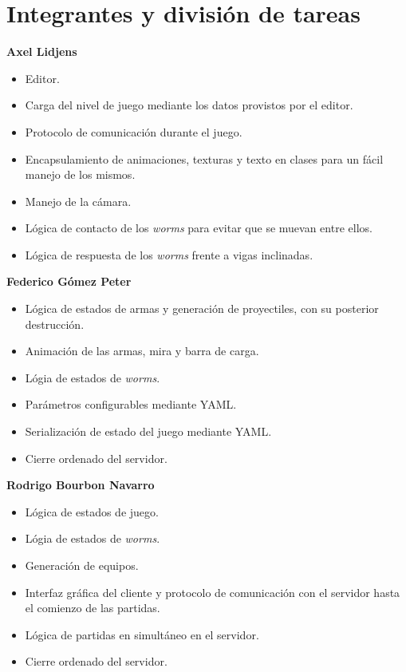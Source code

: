 \documentclass{article}
\begin{document}
\pagestyle{fancy}
\renewcommand{\sectionmark}[1]{\markboth{}{\thesection\ \ #1}}
\chead{}
\rhead{\codMateria - \nombreMateria}
\lfoot{}
\cfoot{\thepage}
\rfoot{}

\newpage

\section{Integrantes y división de tareas}
\label{sec:integrantes}	
%
\textbf{Axel Lidjens}

\begin{itemize}
	\item Editor.
	\item Carga del nivel de juego mediante los datos provistos por el editor.
	\item Protocolo de comunicación durante el juego.
	\item Encapsulamiento de animaciones, texturas y texto en clases para un fácil manejo de los mismos.
	\item Manejo de la cámara.
	\item Lógica de contacto de los \textit{worms} para evitar que se muevan entre ellos.
	\item Lógica de respuesta de los \textit{worms} frente a vigas inclinadas.
\end{itemize}

\textbf{Federico Gómez Peter}

\begin{itemize}
	\item Lógica de estados de armas y generación de proyectiles, con su posterior destrucción.
	\item Animación de las armas, mira y barra de carga.
	\item Lógia de estados de \textit{worms}.
	\item Parámetros configurables mediante YAML.
	\item Serialización de estado del juego mediante YAML.
	\item Cierre ordenado del servidor.
\end{itemize}

\textbf{Rodrigo Bourbon Navarro}

\begin{itemize}
	\item Lógica de estados de juego.
	\item Lógia de estados de \textit{worms}.
	\item Generación de equipos.
	\item Interfaz gráfica del cliente y protocolo de comunicación con el servidor hasta el comienzo de las partidas.
	\item Lógica de partidas en simultáneo en el servidor.
	\item Cierre ordenado del servidor.
\end{itemize}
\end{document}
